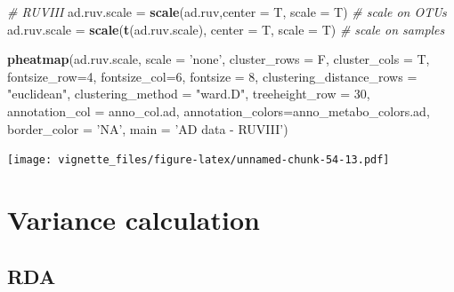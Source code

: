 \documentclass[]{book}
\newenvironment{Shaded}{\begin{snugshade}}{\end{snugshade}}
\newcommand{\KeywordTok}[1]{\textcolor[rgb]{0.13,0.29,0.53}{\textbf{#1}}}
\newcommand{\DataTypeTok}[1]{\textcolor[rgb]{0.13,0.29,0.53}{#1}}
\newcommand{\DecValTok}[1]{\textcolor[rgb]{0.00,0.00,0.81}{#1}}
\newcommand{\StringTok}[1]{\textcolor[rgb]{0.31,0.60,0.02}{#1}}
\newcommand{\CommentTok}[1]{\textcolor[rgb]{0.56,0.35,0.01}{\textit{#1}}}
\newcommand{\NormalTok}[1]{#1}
\begin{document}
\begin{Shaded}
\begin{Highlighting}[]
\CommentTok{# RUVIII}
\NormalTok{ad.ruv.scale =}\StringTok{ }\KeywordTok{scale}\NormalTok{(ad.ruv,}\DataTypeTok{center =}\NormalTok{ T, }\DataTypeTok{scale =}\NormalTok{ T) }\CommentTok{# scale on OTUs}
\NormalTok{ad.ruv.scale =}\StringTok{ }\KeywordTok{scale}\NormalTok{(}\KeywordTok{t}\NormalTok{(ad.ruv.scale), }\DataTypeTok{center =}\NormalTok{ T, }\DataTypeTok{scale =}\NormalTok{ T) }\CommentTok{# scale on samples}

\KeywordTok{pheatmap}\NormalTok{(ad.ruv.scale, }
         \DataTypeTok{scale =} \StringTok{'none'}\NormalTok{, }
         \DataTypeTok{cluster_rows =}\NormalTok{ F, }
         \DataTypeTok{cluster_cols =}\NormalTok{ T, }
         \DataTypeTok{fontsize_row=}\DecValTok{4}\NormalTok{, }\DataTypeTok{fontsize_col=}\DecValTok{6}\NormalTok{,}
         \DataTypeTok{fontsize =} \DecValTok{8}\NormalTok{,}
         \DataTypeTok{clustering_distance_rows =} \StringTok{"euclidean"}\NormalTok{,}
         \DataTypeTok{clustering_method =} \StringTok{"ward.D"}\NormalTok{,}
         \DataTypeTok{treeheight_row =} \DecValTok{30}\NormalTok{,}
         \DataTypeTok{annotation_col =}\NormalTok{ anno_col.ad,}
         \DataTypeTok{annotation_colors=}\NormalTok{anno_metabo_colors.ad,}
         \DataTypeTok{border_color =} \StringTok{'NA'}\NormalTok{,}
         \DataTypeTok{main =} \StringTok{'AD data - RUVIII'}\NormalTok{)}
\end{Highlighting}
\end{Shaded}

\texttt{[image: vignette\_files/figure-latex/unnamed-chunk-54-13.pdf]}

\section{Variance calculation}\label{variance-calculation}

\subsection{RDA}\label{rda}
\end{document}
